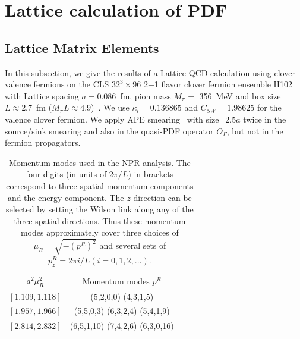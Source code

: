\section{Lattice calculation of PDF}\label{sec:numerical}

\subsection{Lattice Matrix Elements}

In this subsection,  we give  the results of a Lattice-QCD calculation using clover valence fermions on  {the CLS $32^3\times96$ 2+1 flavor clover fermion ensemble H102 with Lattice spacing $a=0.086$~fm, pion mass $M_\pi=$ 356~MeV and box size $L\approx 2.7$~fm ($M_\pi L\approx 4.9$)~\cite{Bruno:2014jqa}. We use  $\kappa_l=0.136865$ and $C_{SW}=1.98625$ for the valence clover fermion. We apply APE smearing~\cite{Hasenfratz:2001hp} with size=2.5$a$ twice in the source/sink smearing and also in the quasi-PDF operator $O_\Gamma$, but not in the fermion propagators.}

\begin{table}[htbp]
\begin{center}
\caption{\label{table:p_modes}
Momentum modes   used in the NPR analysis. The four digits (in units of $2\pi/L$) in   brackets correspond to   three spatial momentum components and the energy  component. The $z$ direction can be selected by  setting   the Wilson link along any of the three spatial directions.  Thus these momentum modes approximately cover  three choices  of $\mu_R=\sqrt{-(p^R)^2}$ and several sets of $p^R_z= 2\pi i/L(i=0,1,2,...)$.  }
\begin{tabular}{c|ccc}
\hline 
$a^2\mu_R^2$ & Momentum modes $p^R$ \\
$ [1.109,1.118]$ &(5,2,0,0)   (4,3,1,5)   \\
$ [1.957,1.966]$ &(5,5,0,3)  (6,3,2,4)   (5,4,1,9) \\
$ [2.814,2.832]$ &(6,5,1,10)   (7,4,2,6)   (6,3,0,16)\\
\hline
\end{tabular}
\end{center}
\end{table}


